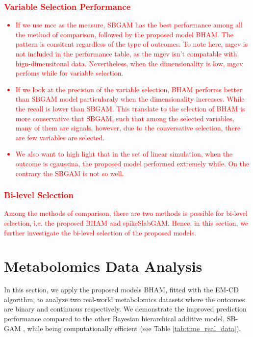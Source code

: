 \documentclass[AMA,STIX1COL,]{WileyNJD-v2}
\begin{document}
\textcolor{red}{\subsubsection{Variable Selection Performance}
\begin{itemize}
\item If we use mcc as the measure, SBGAM has the best performance among all the method of comparison, followed by the proposed model BHAM. The pattern is consitent regardless of the type of outcomes. To note here, mgcv is not included in the performance table, as the mgcv isn't compatable with hign-dimensitonal data. Nevertheless, when the dimensionality is low, mgcv perfoms while for variable selection.
\item If we look at the precision of the variable selection, BHAM performs better than SBGAM model particularaly when the dimensionality increases. While the recall is lower than SBGAM. This translate to the selection of BHAM is more conservative that SBGAM, such that among the selected variables, many of them are signals, however, due to the conversative selection, there are few variables are selected.
\item We also want to high light that in the set of linear simulation, when the outcome is cgaussina, the proposed model performed extremely while. On the contrary the SBGAM is not so well.
\end{itemize}

}

\textcolor{red}{\subsubsection{Bi-level Selection}
Among the methods of comparison, there are two methods is possible for bi-level selection, i.e. the proposed BHAM and spikeSlabGAM. Hence, in this section, we further investigate the bi-level selection of the proposed models. }

\section{Metabolomics Data Analysis}
\label{sec:real_data}

In this section, we apply the proposed models BHAM, fitted with the
EM-CD algorithm, to analyze two real-world metabolomics datasets where
the outcomes are binary and continuous respectively. We demonstrate the
improved prediction performance compared to the other Bayesian
hierarchical additive model, SB-GAM \citep{Bai2021}, while being
computationally efficient (see Table \ref{tab:time_real_data}).
\end{document}
